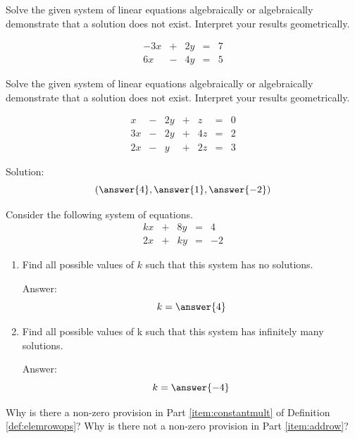 \documentclass{ximera}
\begin{document}
  \begin{problem}\label{prob:solvesys2}
Solve the given system of linear equations algebraically or algebraically demonstrate that a solution does not exist.  Interpret your results geometrically.
  
  $$\begin{array}{ccccc}
      -3x & +&2y&= &7 \\
	 6x& -&4y&=&5
    \end{array}$$
  \end{problem}
  
  
  \begin{problem}\label{prob:solvesys3}
Solve the given system of linear equations algebraically or algebraically demonstrate that a solution does not exist.  Interpret your results geometrically.
  
$$\begin{array}{ccccccc}
      x & -&2y&+&z&= &0 \\
	 3x& -&2y&+&4z&=&2\\
     2x& -&y&+&2z&=&3
    \end{array}$$
    
Solution:    $$(\answer{4},\answer{1},\answer{-2})$$
\end{problem}
    
     \begin{problem}\label{prob:sysnosolfindk}
Consider the following system of equations.
  $$\begin{array}{ccccc}
      kx & +&8y&= &4 \\
	 2x& +&ky&=&-2
    \end{array}$$
     
\begin{enumerate} 
\item Find all possible values of $k$ such that this system has no solutions.

Answer: $$k=\answer{4}$$

\item Find all possible values of k such that this system has infinitely many solutions.

Answer: $$k=\answer{-4}$$
\end{enumerate}
  \end{problem}
  
\begin{problem}\label{prob:nonzeroprovision}
Why is there a non-zero provision in Part \ref{item:constantmult} of Definition \ref{def:elemrowops}?  Why is there not a non-zero provision in Part \ref{item:addrow}?
\end{problem}
\end{document}
